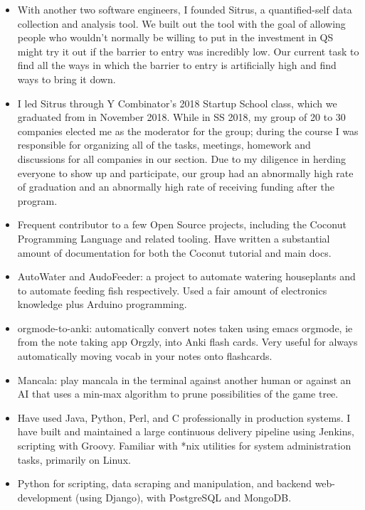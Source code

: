 \documentclass[letterpaper,10pt]{article}
\newlength{\outerbordwidth}
\newcommand{\resitem}[1]{
    \item #1 \vspace{-2pt}
}
\newcommand{\resheading}[1]{
    \vspace{8pt}
    \parbox{\textwidth}{\setlength{\FrameSep}{\outerbordwidth}
        \begin{shaded}
            \setlength{\fboxsep}{0pt}\framebox[\textwidth][l]{\setlength{\fboxsep}{4pt}\fcolorbox{shadecolorB}{shadecolorB}{
                \textbf{
                    \sffamily{
                        \mbox{~}\makebox[6.5in][l]{\large #1} \vphantom{
                            p\^{E}}
                        }
                    }
                }
            }
        \end{shaded}
  }\vspace{-5pt}
}
\begin{document}
\begin{itemize}
    \resitem{With another two software engineers, I founded Sitrus, a quantified-self data collection and analysis tool. We built out the tool with the goal of allowing people who wouldn't normally be willing to put in the investment in QS might try it out if the barrier to entry was incredibly low. Our current task to find all the ways in which the barrier to entry is artificially high and find ways to bring it down.}
    	\resitem{I led Sitrus through Y Combinator's 2018 Startup School class, which we graduated from in November 2018. While in SS 2018, my group of 20 to 30 companies elected me as the moderator for the group; during the course I was responsible for organizing all of the tasks, meetings, homework and discussions for all companies in our section. Due to my diligence in herding everyone to show up and participate, our group had an abnormally high rate of graduation and an abnormally high rate of receiving funding after the program.}
    \resitem{Frequent contributor to a few Open Source projects, including the Coconut Programming Language and related tooling. Have written a substantial amount of documentation for both the Coconut tutorial and main docs.}
    
    \iffalse
    \resitem{Run a small personal website for hosting projects and posts.}
    \fi
    
    \resitem{AutoWater and AudoFeeder: a project to automate watering houseplants and to automate feeding fish respectively. Used a fair amount of electronics knowledge plus Arduino programming.}
    \resitem{orgmode-to-anki: automatically convert notes taken using emacs orgmode, ie from the note taking app Orgzly, into Anki flash cards. Very useful for always automatically moving vocab in your notes onto flashcards.}
    \resitem{Mancala: play mancala in the terminal against another human or against an AI that uses a min-max algorithm to prune possibilities of the game tree.}
\end{itemize}


\resheading{Technical Skills}

\begin{itemize}
    \resitem{Have used Java, Python, Perl, and C professionally in production systems. I have built and maintained a large continuous delivery pipeline using Jenkins, scripting with Groovy. Familiar with *nix utilities for system administration tasks, primarily on Linux.}
    \resitem{Python for scripting, data scraping and manipulation, and backend web-development (using Django), with PostgreSQL and MongoDB.}
    \iffalse
    \resitem{Familiar with C++, Javascript, Haskell, Coconut, and Nim.}
    \fi
\end{itemize}

\end{document}
